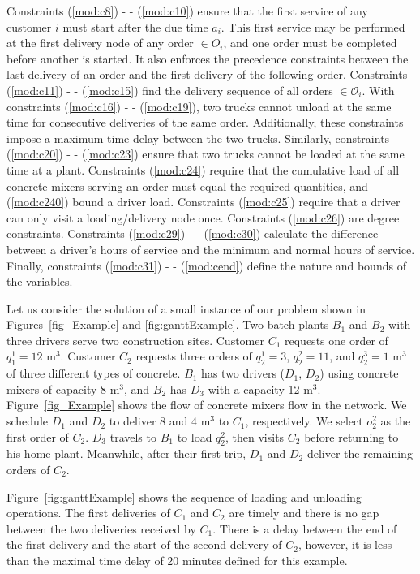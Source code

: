 Constraints (\ref{mod:c8}) - - (\ref{mod:c10}) ensure that the first service of any customer $i$ must start after the due time $a_i$. This first service may be performed at the first delivery node of any order $\in O_i$, and one order must be completed before another is started. It also enforces the precedence constraints between the last delivery of an order and the first delivery of the following order.
Constraints (\ref{mod:c11}) - - (\ref{mod:c15}) find the delivery sequence of all orders $\in \mathcal{O}_i$. With constraints (\ref{mod:c16}) - - (\ref{mod:c19}), two trucks cannot unload at the same time for consecutive deliveries of the same order. Additionally, these constraints impose a maximum time delay between the two trucks. Similarly, constraints (\ref{mod:c20}) - - (\ref{mod:c23}) ensure that two trucks cannot be loaded at the same time at a plant. Constraints (\ref{mod:c24}) require that the cumulative load of all concrete mixers serving an order must equal the required quantities, and (\ref{mod:c240}) bound a driver load.  Constraints (\ref{mod:c25}) require that a driver can only visit a loading/delivery node once. Constraints (\ref{mod:c26}) are degree constraints. Constraints (\ref{mod:c29}) - - (\ref{mod:c30}) calculate the difference between a driver's hours of service and the minimum and normal hours of service. Finally, constraints (\ref{mod:c31}) - - (\ref{mod:cend}) define the nature and bounds of the variables.

Let us consider the solution of a small instance of our problem shown in Figures~\ref{fig_Example} and \ref{fig:ganttExample}. Two batch plants $B_1$ and $B_2$ with three drivers serve two construction sites. Customer $C_1$ requests one order of $q^1_1=12$ m$^3$. Customer $C_2$ requests three orders of $q^1_2=3$, $q^2_2=11$, and $q^3_2=1$ m$^3$ of three different types of concrete. $B_1$ has two drivers ($D_1$, $D_2$) using concrete mixers of capacity 8 m$^3$, and $B_2$ has $D_3$ with a capacity 12 m$^3$. Figure~\ref{fig_Example} shows the flow of concrete mixers flow in the network. We schedule $D_1$ and $D_2$ to deliver 8 and 4 m$^3$ to $C_1$, respectively. We select $o^2_2$ as the first order of $C_2$. $D_3$ travels to $B_1$ to load $q^2_2$, then visits $C_2$ before returning to his home plant. Meanwhile, after their first trip,  $D_1$ and $D_2$ deliver the remaining orders of $C_2$.

Figure~\ref{fig:ganttExample} shows the sequence of loading and unloading operations. The first deliveries of $C_1$ and $C_2$ are timely and there is no gap between the two deliveries received by $C_1$. There is a delay between the end of the first delivery and the start of the second delivery of $C_2$, however, it is less than the maximal time delay of 20 minutes defined for this example.



